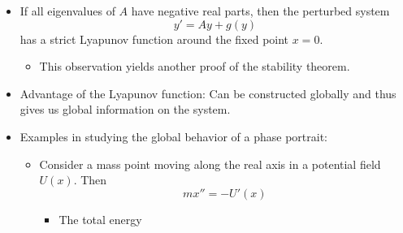 \documentclass[../notes.tex]{subfiles}
\begin{document}
\begin{itemize}
\begin{enumerate}
\begin{proof}
        \end{proof}
        \item Asymptotically stable if there is a strict Lyapunov function near it.
        \begin{proof}
            If $x\in\{x\mid L(x)<m\}\cap B(x_0,\delta)$, then $L(\phi_t(x))$ is strictly decreasing. As $t\to +\infty$, $\phi_t(x)$ has a partial limit $z_0$, say $\phi_{t_k}(x)\to z_0$ (Lemma 6.6 of \textcite{bib:Teschl}). If $z_0\neq x_0$, then the orbit $\{\phi_t(z_0)\mid t\in I_{z_0}\}$ is not a single point: Since $L$ is a strict Lyapunov function, we have $L(\phi_t(z_0))<L(z_0)$ for all $t>0$. When $k$ is large, $\phi_{t_k}(x)$ is close to $z_0$, so by continuity,
            \begin{equation*}
                L(\phi_{t+t_k}(x)) = L(\phi_t(\phi_{t_k}(x))) < L(z_0)
            \end{equation*}
            But this contradicts $L(\phi_t(x))>L(z_0)$ (which we must have if there are arbitrarily large $t$ such that $\phi_t(x)$ is close to $z_0$). Therefore, $x_0=z_0$.
        \end{proof}
    \end{enumerate}
    \item If all eigenvalues of $A$ have negative real parts, then the perturbed system
    \begin{equation*}
        y' = Ay+g(y)
    \end{equation*}
    has a strict Lyapunov function around the fixed point $x=0$.
    \begin{itemize}
        \item This observation yields another proof of the stability theorem.
    \end{itemize}
    \item Advantage of the Lyapunov function: Can be constructed globally and thus gives us global information on the system.
    \item Examples in studying the global behavior of a phase portrait:
    \begin{itemize}
        \item Consider a mass point moving along the real axis in a potential field $U(x)$. Then
        \begin{equation*}
            mx'' = -U'(x)
        \end{equation*}
        \begin{itemize}
            \item The total energy
            \begin{equation*}

\end{equation*}
\end{itemize}
\end{itemize}
\end{itemize}
\end{document}
